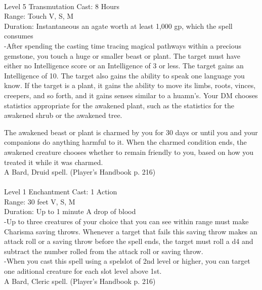\documentclass[10pt,twocolumn]{report}
\begin{document}
 \\
Level 5 \quad Transmutation \quad Cast: 8 Hours\\
Range: Touch \quad V, S, M\\
Duration: Instantaneous \quad an agate worth at least 1,000 gp, which the spell consumes\\
-After spending the casting time tracing magical pathways within a precious gemstone, you touch a huge or smaller beast or plant. 
The target must have either no Intelligence score or an Intelligence of 3 or less. The target gains an Intelligence of 10. The target also gains the ability to speak one language you know. If the target is a plant, it gains the ability to move its limbs, roots, vinces, creepers, and so forth, and it gains senses similar to a huamn’s. Your DM chooses statistics appropriate for the awakened plant, such as the statistics for the awakened shrub or the awakened tree. 

The awakened beast or plant is charmed by you for 30 days or until you and your companions do anything harmful to it. When the charmed condition ends, the awakened creature chooses whether to remain friendly to you, based on how you treated it while it was charmed.\\
A Bard, Druid spell. (Player's Handbook p. 216) \\


 \\
Level 1 \quad Enchantment \quad Cast: 1 Action\\
Range: 30 feet \quad V, S, M\\
Duration: Up to 1 minute \quad A drop of blood\\
-Up to three creatures of your choice that you can see within range must make Charisma saving throws. Whenever a target that fails this saving throw makes an attack roll or a saving throw before the spell ends, the target must roll a d4 and subtract the number rolled from the attack roll or saving throw.\\
-When you cast this spell using a spelslot of 2nd level or higher, you can target one aditional creature for each slot level above 1st.\\
A Bard, Cleric spell. (Player's Handbook p. 216) \\
\end{document}

